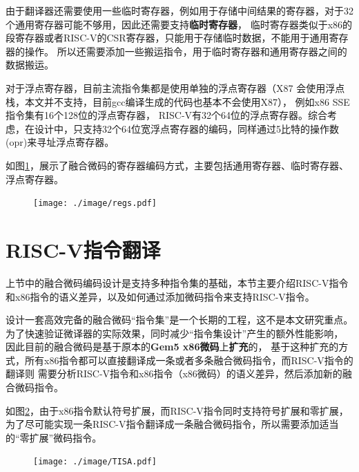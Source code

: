 由于翻译器还需要使用一些临时寄存器，例如用于存储中间结果的寄存器，对于32个通用寄存器可能不够用，因此还需要支持\textbf{临时寄存器}，
临时寄存器类似于x86的段寄存器或者RISC-V的CSR寄存器，只能用于存储临时数据，不能用于通用寄存器的操作。
所以还需要添加一些搬运指令，用于临时寄存器和通用寄存器之间的数据搬运。

对于浮点寄存器，目前主流指令集都是使用单独的浮点寄存器（X87 会使用浮点栈，本文并不支持，目前gcc编译生成的代码也基本不会使用X87），
例如x86 SSE指令集有16个128位的浮点寄存器，
RISC-V有32个64位的浮点寄存器。综合考虑，在设计中，只支持32个64位宽浮点寄存器的编码，同样通过5比特的操作数(opr)来寻址浮点寄存器。

如图\ref{img:regs}，展示了融合微码的寄存器编码方式，主要包括通用寄存器、临时寄存器、浮点寄存器。

\begin{figure}[h]
  \centering
  \texttt{[image: ./image/regs.pdf]}
  \label{img:regs}
\end{figure}



\section{RISC-V指令翻译}

上节中的融合微码编码设计是支持多种指令集的基础，本节主要介绍RISC-V指令和x86指令的语义差异，以及如何通过添加微码指令来支持RISC-V指令。

设计一套高效完备的融合微码“指令集”是一个长期的工程，这不是本文研究重点。
为了快速验证微译器的实际效果，同时减少“指令集设计”产生的额外性能影响，
因此目前的融合微码是基于原本的\textbf{Gem5 x86微码}上\textbf{扩充}的，
基于这种扩充的方式，所有x86指令都可以直接翻译成一条或者多条融合微码指令，而RISC-V指令的翻译则
需要分析RISC-V指令和x86指令（x86微码）的语义差异，然后添加新的融合微码指令。

如图\ref{img:TISA}，由于x86指令默认符号扩展，而RISC-V指令同时支持符号扩展和零扩展，
为了尽可能实现一条RISC-V指令翻译成一条融合微码指令，所以需要添加适当的“零扩展”微码指令。

\begin{figure}[!htbp]
  \centering
  \texttt{[image: ./image/TISA.pdf]}
  \label{img:TISA}
\end{figure}

